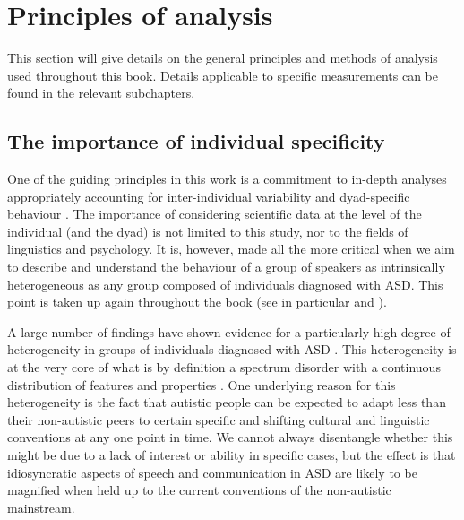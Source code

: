 	\section{Principles of analysis}\label{analysis}

This section will give details on the general principles and methods of analysis used throughout this book. Details applicable to specific measurements can be found in the relevant subchapters.


	\subsection{The importance of individual specificity}\label{analysis_individual}


One of the guiding principles in this work is a commitment to in-depth analyses appropriately accounting for inter-individual variability and dyad-specific behaviour \citep[cf.][]{bruggemanUnifyingSpeakerVariability2017, cangemiSpeakerspecificIntonationalMarking2016, cangemiListenerspecificPerceptionSpeakerspecific2015}. The importance of considering scientific data at the level of the individual (and the dyad) is not limited to this study, nor to the fields of linguistics and psychology. It is, however, made all the more critical when we aim to describe and understand the behaviour of a group of speakers as intrinsically heterogeneous as any group composed of individuals diagnosed with ASD. This point is taken up again throughout the book (see in particular  and ).

A large number of findings have shown evidence for a particularly high degree of heterogeneity in groups of individuals diagnosed with ASD \citep[e.g.][]{wozniakDevelopmentAutismSpectrum2017}. This heterogeneity is at the very core of what is by definition a spectrum disorder with a continuous distribution of features and properties \citep{americanpsychiatricassociationDiagnosticStatisticalManual2013}. One underlying reason for this heterogeneity is the fact that autistic people can be expected to adapt less than their non-autistic peers to certain specific and shifting cultural and linguistic conventions at any one point in time. We cannot always disentangle whether this might be due to a lack of interest or ability in specific cases, but the effect is that idiosyncratic aspects of speech and communication in ASD are likely to be magnified when held up to the current conventions of the non-autistic mainstream.

